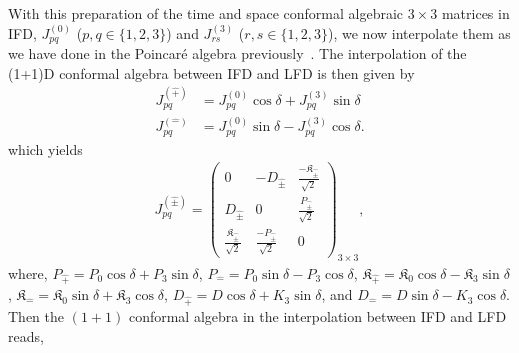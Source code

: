 \documentclass[%
 reprint,
superscriptaddress,
 amsmath,amssymb,
 aps,
]{revtex4-2}
\begin{document}
{\color{red} With this preparation of the time and space conformal algebraic $3\times3$ matrices in IFD, $J^{(0)}_{pq}$ ($p,q\in\{1,2,3\}$) and $J^{(3)}_{rs}$ ($r,s\in\{1,2,3\}$), we now interpolate them as we have done in the Poincar\'e algebra previously~\cite{Ji2001, Ji2025}. The interpolation of the (1+1)D conformal algebra  between IFD and LFD is then given by  
\begin{align}
    J^{(\hat{+})}_{pq}&=J^{(0)}_{pq}\cos{\delta}+J^{(3)}_{pq}\sin{\delta}\\
    J^{(\hat{-})}_{pq}&=J^{(0)}_{pq}\sin{\delta}-J^{(3)}_{pq}\cos{\delta}.
\end{align}
which yields
\begin{align}
    J^{(\hat{\pm})}_{pq}=
  \begin{pmatrix}
  0&-D_{\hat{\pm}}&\frac{-\mathfrak{K}_{\hat{\pm}}}{\sqrt{2}}\\
  D_{\hat{\pm}}&0&\frac{P_{\hat{\pm}}}{\sqrt{2}}\\
    \frac{\mathfrak{K}_{\hat{\pm}}}{\sqrt{2}}&\frac{-P_{\hat{\pm}}}{\sqrt{2}}&0  
  \end{pmatrix}_{3\times3},
\end{align}
where, $P_{\hat{+}}=P_0\cos{\delta}+P_3\sin{\delta}$, $P_{\hat{-}}=P_0\sin{\delta}-P_3\cos{\delta}$, $\mathfrak{K}_{\hat{+}}=\mathfrak{K}_0\cos{\delta}-\mathfrak{K}_3\sin{\delta}$,  $\mathfrak{K}_{\hat{-}}=\mathfrak{K}_0\sin{\delta}+\mathfrak{K}_3\cos{\delta}$, $D_{\hat{+}}=D\cos\delta+K_{3}\sin\delta$, and $D_{\hat{-}}=D\sin\delta-K_{3}\cos\delta$.}
Then the $(1+1)$ conformal algebra in the interpolation between IFD and LFD reads,
\end{document}
